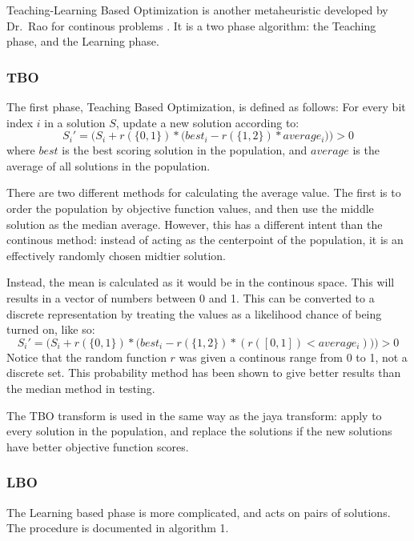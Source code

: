 \documentclass[11pt, letterpaper, onecolumn]{article}
\begin{document}
Teaching-Learning Based Optimization is another metaheuristic developed by Dr.~Rao for continous problems %
. It is a two phase algorithm: the Teaching phase, and the Learning phase.

\subsubsection{TBO}

The first phase, Teaching Based Optimization, is defined as follows: For every bit index $i$ in a solution $S$, update a new solution according to: 
\begin{equation}
S_i' = \Big(S_i + r(\{0, 1\})*\big(best_i - r(\{1, 2\})*average_i\big)\Big) > 0
\end{equation}
where $best$ is the best scoring solution in the population, and $average$ is the average of all solutions in the population. 

There are two different methods for calculating the average value. The first is to order the population by objective function values, and then use the middle solution as the median average. However, this has a different intent than the continous method: instead of acting as the centerpoint of the population, it is an effectively randomly chosen midtier solution. 

Instead, the mean is calculated as it would be in the continous space. This will results in a vector of numbers between 0 and 1. This can be converted to a discrete representation by treating the values as a likelihood chance of being turned on, like so: 
\begin{equation}
S_i' = \Big(S_i + r(\{0, 1\})*\big(best_i - r(\{1, 2\})*(r([0, 1]) < average_i)\big)\Big) > 0
\end{equation}
Notice that the random function $r$ was given a continous range from 0 to 1, not a discrete set. This probability method has been shown to give better results than the median method in testing. 

The TBO transform is used in the same way as the jaya transform: apply to every solution in the population, and replace the solutions if the new solutions have better objective function scores.

\subsubsection{LBO}

The Learning based phase is more complicated, and acts on pairs of solutions. The procedure is documented in algorithm 1. 
\end{document}
